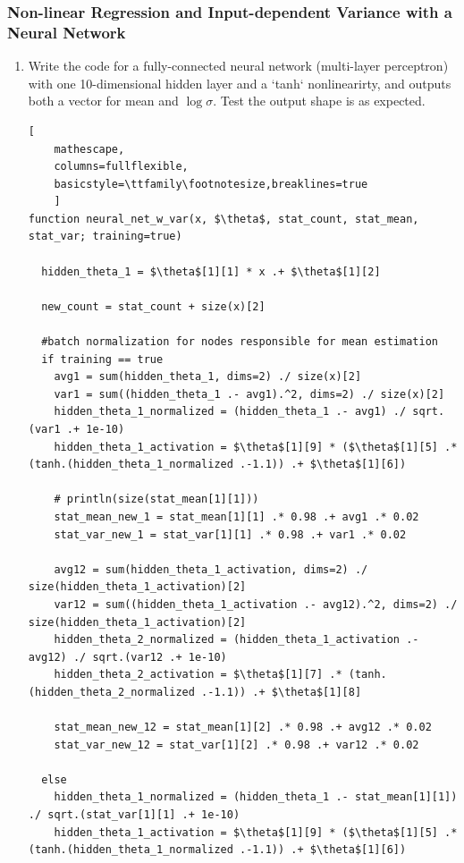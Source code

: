\documentclass[12pt,letter]{article}
\begin{document}
\pagebreak

\subsubsection{Non-linear Regression and Input-dependent Variance with a Neural Network}

\begin{enumerate}
  
\item Write the code for a fully-connected neural network (multi-layer perceptron) with one 10-dimensional hidden layer and a `tanh` nonlinearirty, and outputs both a vector for mean and $\log \sigma$. Test the output shape is as expected.

\pagebreak
  
\begin{lstlisting}[
    mathescape,
    columns=fullflexible,
    basicstyle=\ttfamily\footnotesize,breaklines=true
    ]
function neural_net_w_var(x, $\theta$, stat_count, stat_mean, stat_var; training=true)

  hidden_theta_1 = $\theta$[1][1] * x .+ $\theta$[1][2]

  new_count = stat_count + size(x)[2]

  #batch normalization for nodes responsible for mean estimation
  if training == true
    avg1 = sum(hidden_theta_1, dims=2) ./ size(x)[2]
    var1 = sum((hidden_theta_1 .- avg1).^2, dims=2) ./ size(x)[2]
    hidden_theta_1_normalized = (hidden_theta_1 .- avg1) ./ sqrt.(var1 .+ 1e-10)
    hidden_theta_1_activation = $\theta$[1][9] * ($\theta$[1][5] .* (tanh.(hidden_theta_1_normalized .-1.1)) .+ $\theta$[1][6])

    # println(size(stat_mean[1][1]))
    stat_mean_new_1 = stat_mean[1][1] .* 0.98 .+ avg1 .* 0.02
    stat_var_new_1 = stat_var[1][1] .* 0.98 .+ var1 .* 0.02

    avg12 = sum(hidden_theta_1_activation, dims=2) ./ size(hidden_theta_1_activation)[2]
    var12 = sum((hidden_theta_1_activation .- avg12).^2, dims=2) ./ size(hidden_theta_1_activation)[2]
    hidden_theta_2_normalized = (hidden_theta_1_activation .- avg12) ./ sqrt.(var12 .+ 1e-10)
    hidden_theta_2_activation = $\theta$[1][7] .* (tanh.(hidden_theta_2_normalized .-1.1)) .+ $\theta$[1][8]

    stat_mean_new_12 = stat_mean[1][2] .* 0.98 .+ avg12 .* 0.02
    stat_var_new_12 = stat_var[1][2] .* 0.98 .+ var12 .* 0.02

  else
    hidden_theta_1_normalized = (hidden_theta_1 .- stat_mean[1][1]) ./ sqrt.(stat_var[1][1] .+ 1e-10)
    hidden_theta_1_activation = $\theta$[1][9] * ($\theta$[1][5] .* (tanh.(hidden_theta_1_normalized .-1.1)) .+ $\theta$[1][6])


\end{lstlisting}
\end{enumerate}
\end{document}
